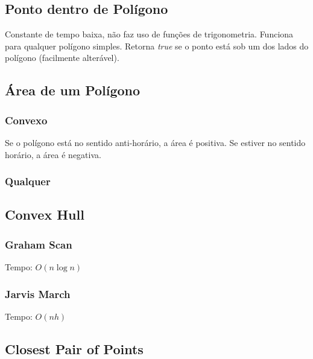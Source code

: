 \documentclass[12pt,a4paper]{article}
\begin{document}
		\subsection{Ponto dentro de Polígono}
			Constante de tempo baixa, não faz uso de funções de trigonometria. Funciona para qualquer polígono simples. Retorna \emph{true} se o ponto está sob um dos lados do polígono (facilmente alterável).
			
		\subsection{Área de um Polígono}
			\subsubsection{Convexo}
				Se o polígono está no sentido anti-horário, a área é positiva. Se estiver no sentido horário, a área é negativa.
				
			\subsubsection{Qualquer}
				
		\subsection{Convex Hull}
			\subsubsection{Graham Scan}
				Tempo: \(O(n \log n)\)
				
			\subsubsection{Jarvis March}
				Tempo: \(O(n h)\)
				
		\subsection{Closest Pair of Points}
			
\end{document}
